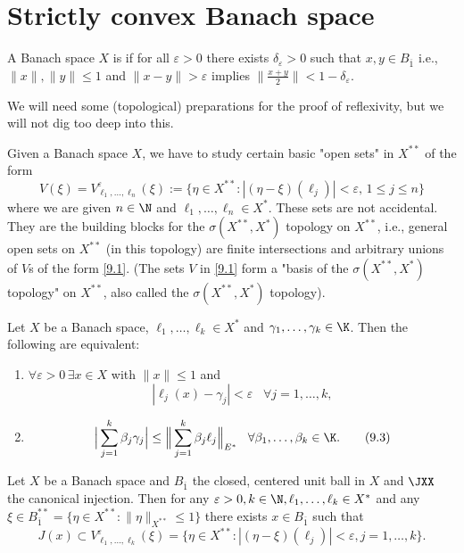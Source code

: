 \section{Strictly convex Banach space}

\begin{definition}\label{ix.1}
    A Banach space $X$ is  if for all $\varepsilon>0$ there exists $\delta_\varepsilon>0$ such that $x,y\in B_{\overline{1}}$ \rec{(}i.e., $\|x\|,\|y\|\leq1$\rec{)} and $\|x-y\|>\varepsilon$ implies $\|\frac{x+y}{2}\|<1-\delta_\varepsilon$.
\end{definition}

We will need some (topological) preparations for the proof of reflexivity, but we will not dig too deep into this.\vspace{4mm}
    
Given a Banach space $X$, we have to study certain basic "open sets" in $X^{**}$ of the form
\[V(\xi)=V_{\ell_1,\ldots,\ell_n}^\varepsilon(\xi):=\{\eta\in X^{**}\colon|(\eta-\xi)(\ell_j)|<\varepsilon,\,1\leq j\leq n\}\tag{9.1}\label{9.1}\]
where we are given $n\in \N$ and $\ell_1,\ldots,\ell_n\in X^*$. These sets are not accidental. They are the building blocks for the $\sigma(X^{**},X^*)$ topology on $X^{**}$, i.e., general open sets on $X^{**}$ (in this topology) are finite intersections and arbitrary unions of $V$s of the form \eqref{9.1}. (The sets $V$ in \eqref{9.1} form a "basis of the $\sigma(X^{**},X^*)$ topology" on $X^{**}$, also called the $\sigma(X^{**},X^*)$ topology).

\begin{lem}\label{ix.2}
    Let $X$ be a Banach space, $\ell_1,\ldots,\ell_k\in X^*$ and $\gamma_1,\ldots,\gamma_k\in\K$. Then the following are equivalent:
    \begin{enumerate}[label=\alph*)]
        \item \label{ix.2.a}$\forall\varepsilon>0\,\exists x\in X$ with $\|x\|\leq1$ and
        \[|\ell_j(x)-\gamma_j|<\varepsilon\;\;\;\forall j=1,\ldots,k,\tag{9.2}\label{9.2}\]
        \item \label{ix.2.b} \[\Big|\sum_{j=1}^k\beta_j\gamma_j\Big|\leq\Big\|\sum_{j=1}^k\beta_j\ell_j\Big\|_{E^*}\;\;\;\forall\beta_1,\ldots,\beta_k\in\K.\tag{9.3}\label{9.3}\]
    \end{enumerate}
\end{lem}

\begin{lem}\label{ix.3}
    Let $X$ be a Banach space and $B_{\overline{1}}$ the closed, centered unit ball in $X$ and $\JXX$ the canonical injection. Then for any $\varepsilon>0,k\in\N,\ell_1,\ldots,\ell_k\in X^*$ and any $\xi\in B_{\overline{1}}^{**}=\{\eta\in X^{**}\colon\|\eta\|_{X^{**}}\leq1\}$ there exists $x\in B_{\overline{1}}$ such that
    \[J(x)\subset V_{\ell_1,\ldots,\ell_k}^\varepsilon(\xi)=\{\eta\in X^{**}\colon|(\eta-\xi)(\ell_j)|<\varepsilon,j=1,\ldots,k\}.\tag{9.5}\label{9.5}\]
\end{lem}

